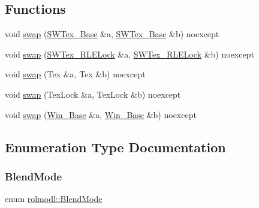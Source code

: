 \subsection*{Functions}
\begin{DoxyCompactItemize}
\item 
void \mbox{\hyperlink{namespacerolmodl_a6972596ae43e62bf3497e9fe22891a80}{swap}} (\mbox{\hyperlink{classrolmodl_1_1_s_w_tex___base}{S\+W\+Tex\+\_\+\+Base}} \&a, \mbox{\hyperlink{classrolmodl_1_1_s_w_tex___base}{S\+W\+Tex\+\_\+\+Base}} \&b) noexcept
\item 
void \mbox{\hyperlink{namespacerolmodl_a127e66db8b178a299aec5f25b6df83a9}{swap}} (\mbox{\hyperlink{classrolmodl_1_1_s_w_tex___r_l_e_lock}{S\+W\+Tex\+\_\+\+R\+L\+E\+Lock}} \&a, \mbox{\hyperlink{classrolmodl_1_1_s_w_tex___r_l_e_lock}{S\+W\+Tex\+\_\+\+R\+L\+E\+Lock}} \&b) noexcept
\item 
void \mbox{\hyperlink{namespacerolmodl_a60f436efe75da5f7503368f157b3ae5c}{swap}} (Tex \&a, Tex \&b) noexcept
\item 
void \mbox{\hyperlink{namespacerolmodl_a5839822387bac1c9fad165e961afdf41}{swap}} (Tex\+Lock \&a, Tex\+Lock \&b) noexcept
\item 
void \mbox{\hyperlink{namespacerolmodl_a3b17406cb55c5adda0581c1aad54f96a}{swap}} (\mbox{\hyperlink{classrolmodl_1_1_win___base}{Win\+\_\+\+Base}} \&a, \mbox{\hyperlink{classrolmodl_1_1_win___base}{Win\+\_\+\+Base}} \&b) noexcept
\end{DoxyCompactItemize}


\subsection{Enumeration Type Documentation}
\mbox{\label{namespacerolmodl_a642c095a75ddf840ce3484384ee5c822}} 
\subsubsection{\texorpdfstring{BlendMode}{BlendMode}}
{\footnotesize\ttfamily enum \mbox{\hyperlink{namespacerolmodl_a642c095a75ddf840ce3484384ee5c822}{rolmodl\+::\+Blend\+Mode}}\hspace{0.3cm}{\ttfamily [strong]}}

